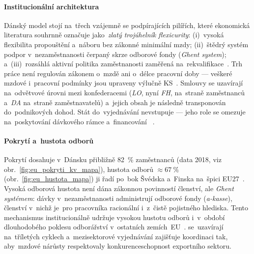 
\paragraph{Institucionální architektura}\label{par:dk_architektura}

Dánský model  stojí na~třech vzájemně se podpírajících pilířích, které
ekonomická literatura souhrnně označuje jako~\emph{zlatý trojúhelník flexicurity}:
(i)~vysoká flexibilita propouštění a~náboru bez zákonné minimální mzdy;
(ii)~štědrý systém podpor v~nezaměstnanosti čerpaný skrze odborové fondy
(\textit{Ghent system}); a~(iii)~rozsáhlá aktivní politika zaměstnanosti
zaměřená na~rekvalifikace~\cite{Petricek_PS1_FlexicurityDK_2019}\cite{Hala_SystemySocialnihoDialogu2013}.
Trh práce není regulován zákonem o~mzdě ani o~délce pracovní doby --- veškeré
mzdové i~pracovní podmínky jsou upraveny výlučně \acs{KS}~\cite{Denmark_LabourMarket}.
Smlouvy se uzavírají na~odvětvové úrovni mezi konfederacemi (\textit{LO},
nyní \textit{FH}, na~straně zaměstnanců a~\textit{DA} na~straně zaměstnavatelů)
a~jejich obsah je následně transponován do~podnikových dohod. Stát do~vyjednávání
nevstupuje --- jeho role se omezuje na~poskytování dávkového rámce
a~financování ~\cite{Petricek_PS1_FlexicurityDK_2019}.

\paragraph{Pokrytí  a~hustota odborů}\label{par:dk_pokryti}

Pokrytí  dosahuje v~Dánsku přibližně \SI{82}{\percent}
zaměstnanců (data 2018, viz obr.~\ref{fig:eu_pokryti_kv_mapa}), hustota odborů
$\approx \SI{67}{\percent}$ (obr.~\ref{fig:eu_hustota_mapa}) ji řadí
po~bok Švédska a~Finska na~špici \acs{EU}27~\cite{Denmark_LabourMarket}\cite{Hala_SystemySocialnihoDialogu2013}.
Vysoká odborová hustota není dána zákonnou povinností členství, ale
\textit{Ghent systémem}: dávky v~nezaměstnanosti administrují odborové fondy
(\textit{a-kasse}), členství v~nichž je~pro pracovníka racionální i~z~čistě
pojistného hlediska. Tento mechanismus institucionálně udržuje vysokou
hustotu odborů i~v~období dlouhodobého poklesu odborářství v~ostatních
zemích~\acs{EU}~\cite{Eurofound_KeyDimensionsIR_2023}.  se~uzavírají
na~tříletých cyklech a~mezisektorové vyjednávání zajišťuje koordinaci tak,
aby~mzdové nárůsty respektovaly konkurenceschopnost exportního sektoru.


